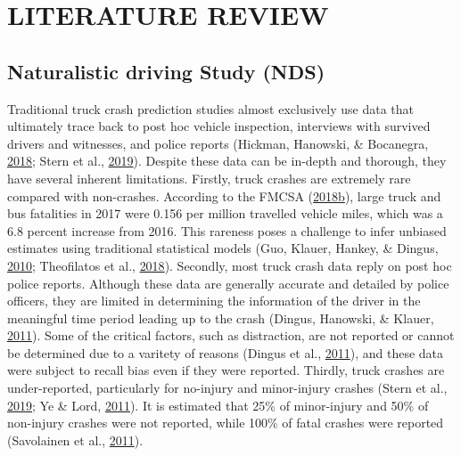 \documentclass[12pt]{book}
\numberwithin{equation}{chapter}
\begin{document}
\hypertarget{literature-review}{%
\chapter{LITERATURE REVIEW}\label{literature-review}}

\hypertarget{naturalistic-driving-study-nds}{%
\section{Naturalistic driving Study (NDS)}\label{naturalistic-driving-study-nds}}

Traditional truck crash prediction studies almost exclusively use data that ultimately trace back to post hoc vehicle inspection, interviews with survived drivers and witnesses, and police reports (Hickman, Hanowski, \& Bocanegra, \protect\hyperlink{ref-hickman2018synthetic}{2018}; Stern et al., \protect\hyperlink{ref-stern2019data}{2019}). Despite these data can be in-depth and thorough, they have several inherent limitations. Firstly, truck crashes are extremely rare compared with non-crashes. According to the FMCSA (\protect\hyperlink{ref-fmcsareport2017}{2018}\protect\hyperlink{ref-fmcsareport2017}{b}), large truck and bus fatalities in 2017 were 0.156 per million travelled vehicle miles, which was a 6.8 percent increase from 2016. This rareness poses a challenge to infer unbiased estimates using traditional statistical models (Guo, Klauer, Hankey, \& Dingus, \protect\hyperlink{ref-guo2010near}{2010}; Theofilatos et al., \protect\hyperlink{ref-theofilatos2018impact}{2018}). Secondly, most truck crash data reply on post hoc police reports. Although these data are generally accurate and detailed by police officers, they are limited in determining the information of the driver in the meaningful time period leading up to the crash (Dingus, Hanowski, \& Klauer, \protect\hyperlink{ref-dingus2011estimating}{2011}). Some of the critical factors, such as distraction, are not reported or cannot be determined due to a varitety of reasons (Dingus et al., \protect\hyperlink{ref-dingus2011estimating}{2011}), and these data were subject to recall bias even if they were reported. Thirdly, truck crashes are under-reported, particularly for no-injury and minor-injury crashes (Stern et al., \protect\hyperlink{ref-stern2019data}{2019}; Ye \& Lord, \protect\hyperlink{ref-ye2011investigation}{2011}). It is estimated that 25\% of minor-injury and 50\% of non-injury crashes were not reported, while 100\% of fatal crashes were reported (Savolainen et al., \protect\hyperlink{ref-savolainen2011statistical}{2011}).
\end{document}
